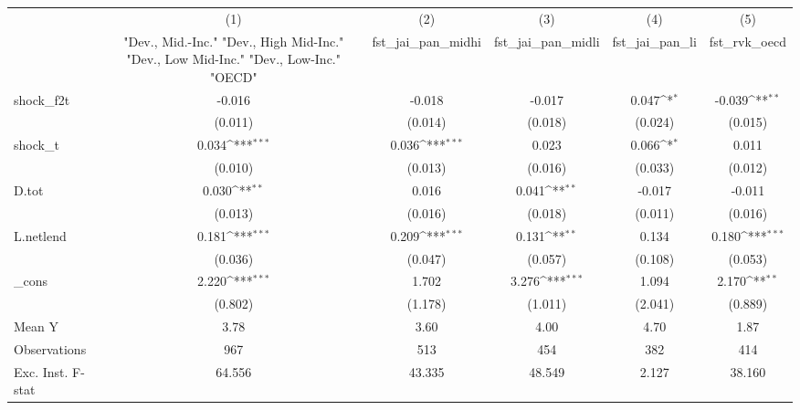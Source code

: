 {
\def\sym#1{\ifmmode^{#1}\else\(^{#1}\)\fi}
\begin{tabular}{l*{5}{c}}
\toprule
            &\multicolumn{1}{c}{(1)}&\multicolumn{1}{c}{(2)}&\multicolumn{1}{c}{(3)}&\multicolumn{1}{c}{(4)}&\multicolumn{1}{c}{(5)}\\
            &\multicolumn{1}{c}{ "Dev., Mid.-Inc." "Dev., High Mid-Inc." "Dev., Low Mid-Inc." "Dev., Low-Inc." "OECD" }&\multicolumn{1}{c}{fst\_jai\_pan\_midhi}&\multicolumn{1}{c}{fst\_jai\_pan\_midli}&\multicolumn{1}{c}{fst\_jai\_pan\_li}&\multicolumn{1}{c}{fst\_rvk\_oecd}\\
\midrule
shock\_f2t   &      -0.016         &      -0.018         &      -0.017         &       0.047\sym{*}  &      -0.039\sym{**} \\
            &     (0.011)         &     (0.014)         &     (0.018)         &     (0.024)         &     (0.015)         \\
\addlinespace
shock\_t     &       0.034\sym{***}&       0.036\sym{***}&       0.023         &       0.066\sym{*}  &       0.011         \\
            &     (0.010)         &     (0.013)         &     (0.016)         &     (0.033)         &     (0.012)         \\
\addlinespace
D.tot       &       0.030\sym{**} &       0.016         &       0.041\sym{**} &      -0.017         &      -0.011         \\
            &     (0.013)         &     (0.016)         &     (0.018)         &     (0.011)         &     (0.016)         \\
\addlinespace
L.netlend   &       0.181\sym{***}&       0.209\sym{***}&       0.131\sym{**} &       0.134         &       0.180\sym{***}\\
            &     (0.036)         &     (0.047)         &     (0.057)         &     (0.108)         &     (0.053)         \\
\addlinespace
\_cons      &       2.220\sym{***}&       1.702         &       3.276\sym{***}&       1.094         &       2.170\sym{**} \\
            &     (0.802)         &     (1.178)         &     (1.011)         &     (2.041)         &     (0.889)         \\
\midrule
Mean Y      &        3.78         &        3.60         &        4.00         &        4.70         &        1.87         \\
Observations&         967         &         513         &         454         &         382         &         414         \\
Exc. Inst. F-stat&      64.556         &      43.335         &      48.549         &       2.127         &      38.160         \\
\bottomrule
\end{tabular}
}
